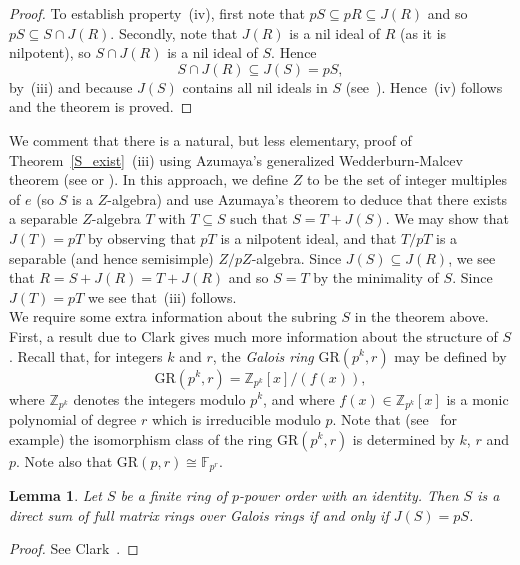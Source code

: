 \documentclass[12pt]{article}
\newtheorem{Lem}[Thm]{Lemma}
\begin{document}
\begin{proof}
To establish property~(iv), first note that
$pS\subseteq pR\subseteq J(R)$ and so $pS\subseteq S\cap J(R)$.
Secondly, note that $J(R)$ is a nil ideal of $R$ (as it is nilpotent), so $S\cap J(R)$ is a nil ideal of $S$. Hence
\[
S\cap J(R)\subseteq J(S)=pS,
\]
by~(iii) and because $J(S)$ contains all nil ideals in $S$ (see~\cite[Corollary to Theorem~I.6.2]{Jacobson}). Hence~(iv) follows and the theorem is proved.
\end{proof}

We comment that there is a natural, but less elementary, proof of Theorem~\ref{S_exist}~(iii) using Azumaya's generalized Wedderburn-Malcev theorem (see \cite[Proposition~19]{Azum 72} or \cite[Theorem~33]{Azum 51}). In this approach, we define $Z$ to be the set of integer multiples of $e$ (so $S$ is a $Z$-algebra) and use Azumaya's theorem to deduce that there exists a separable $Z$-algebra $T$ with $T\subseteq S$ such that $S=T+J(S)$. We may show that $J(T)=pT$ by observing that $pT$ is a nilpotent ideal, and that $T/pT$ is a separable (and hence semisimple) $Z/pZ$-algebra. Since $J(S)\subseteq J(R)$, we see that $R=S+J(R)=T+J(R)$ and so $S=T$ by the minimality of $S$. Since $J(T)=pT$ we see that~(iii) follows. \\

We require some extra information about the subring $S$ in the theorem above. First, a result due to Clark gives much more information about the structure of $S$. Recall that, for integers $k$ and $r$, the \emph{Galois ring} $\mathrm{GR}(p^k,r)$ may be defined by
\[
\mathrm{GR}(p^k,r)=\mathbb{Z}_{p^k}[x]/(f(x)),
\]
where $\mathbb{Z}_{p^k}$ denotes the integers modulo $p^k$, and where $f(x)\in \mathbb{Z}_{p^k}[x]$ is a monic polynomial of degree $r$ which is irreducible modulo $p$. Note that (see~\cite[Section~3]{Raghavendran} for example) the isomorphism class of the ring $\mathrm{GR}(p^k,r)$ is determined by $k$, $r$ and $p$. Note also that $\mathrm{GR}(p,r)\cong \mathbb{F}_{p^r}$.

\begin{Lem}
\label{S_structure}
Let $S$ be a finite ring of $p$-power order with an identity. Then $S$ is a direct sum of full matrix rings over Galois rings if and only if $J(S) = pS$.
\end{Lem}
\begin{proof}
See Clark~\cite[Lemma~3]{Clark}.
\end{proof}
\end{document}
